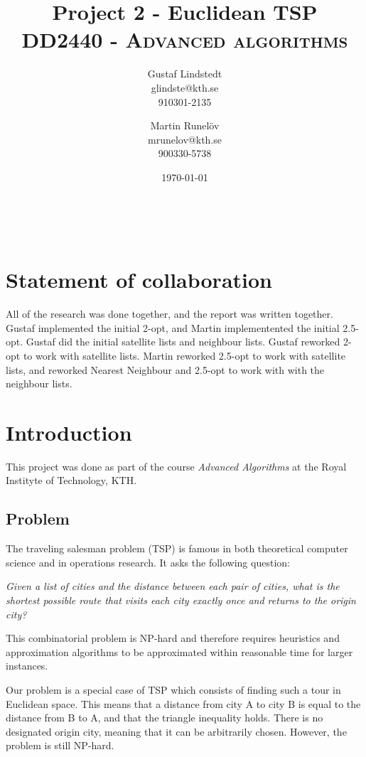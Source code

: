 \documentclass[paper=a4, fontsize=11pt,numbers=endperiod]{scrartcl} %
\title{ 
\huge Project 2 - Euclidean TSP \\ %
\vspace{10pt}
\normalfont \normalsize 
\textsc{DD2440 - Advanced algorithms } \\ [25pt] %
}
\author{Gustaf Lindstedt \\ glindste@kth.se \\ 910301-2135 \and Martin Runelöv \\ mrunelov@kth.se \\ 900330-5738}
\date{\vspace{8pt}\normalsize\today} %
\numberwithin{equation}{section} %
\numberwithin{figure}{section} %
\numberwithin{table}{section} %
\begin{document}
\maketitle %


\hspace{0pt}\\
\section*{Statement of collaboration}
All of the research was done together, and the report was written together.
Gustaf implemented the initial 2-opt, and Martin implementented the initial 2.5-opt.
Gustaf did the initial satellite lists and neighbour lists. Gustaf reworked 2-opt to work with satellite lists.
Martin reworked 2.5-opt to work with satellite lists, and reworked Nearest Neighbour and 2.5-opt to work with with the neighbour lists.

\section{Introduction}

This project was done as part of the course \emph{Advanced Algorithms} at the Royal Instityte of Technology, KTH.

\subsection{Problem}

The traveling salesman problem (TSP) is famous in both theoretical computer science and in operations research. It asks the following question: 

\begin{center}
    \emph{Given a list of cities and the distance between each pair of cities, what is the shortest possible route that visits each city exactly once and returns to the origin city?}
\end{center}

This combinatorial problem is NP-hard and therefore requires heuristics and approximation algorithms to be approximated within reasonable time for larger instances.

Our problem is a special case of TSP which consists of finding such a tour in Euclidean space. This means that a distance from city A to city B is equal to the distance from B to A, and that the triangle inequality holds. There is no designated origin city, meaning that it can be arbitrarily chosen.
However, the problem is still NP-hard.
\end{document}
